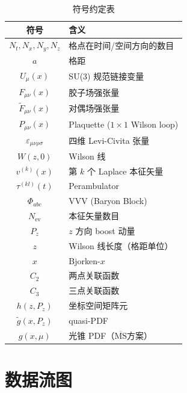 \documentclass[11pt,a4paper]{ctexart}
\newcommand{\Fmunu}{F_{\mu\nu}}
\newcommand{\Ftmunu}{\tilde{F}_{\mu\nu}}
\newcommand{\eps}{\varepsilon}
\newcommand{\MSbar}{$\overline{\text{MS}}$}
\begin{document}
\begin{table}[htbp]
\centering
\caption{符号约定表}
\begin{tabular}{c l}
\toprule
\textbf{符号} & \textbf{含义} \\
\midrule
$N_t, N_x, N_y, N_z$ & 格点在时间/空间方向的数目 \\
$a$ & 格距 \\
$U_\mu(x)$ & SU(3) 规范链接变量 \\
$\Fmunu(x)$ & 胶子场强张量 \\
$\Ftmunu(x)$ & 对偶场强张量 \\
$P_{\mu\nu}(x)$ & Plaquette ($1\times 1$ Wilson loop) \\
$\eps_{\mu\nu\rho\sigma}$ & 四维 Levi-Civita 张量 \\
$W(z, 0)$ & Wilson 线 \\
$v^{(k)}(x)$ & 第 $k$ 个 Laplace 本征矢量 \\
$\tau^{(kl)}(t)$ & Perambulator \\
$\Phi_{abc}$ & VVV (Baryon Block) \\
$N_{\text{ev}}$ & 本征矢量数目 \\
$P_z$ & $z$ 方向 boost 动量 \\
$z$ & Wilson 线长度（格距单位） \\
$x$ & Bjorken-$x$ \\
$C_2$ & 两点关联函数 \\
$C_3$ & 三点关联函数 \\
$h(z, P_z)$ & 坐标空间矩阵元 \\
$\tilde{g}(x, P_z)$ & quasi-PDF \\
$g(x, \mu)$ & 光锥 PDF（\MSbar{}方案） \\
\bottomrule
\end{tabular}
\end{table}

\section{数据流图}
\end{document}
